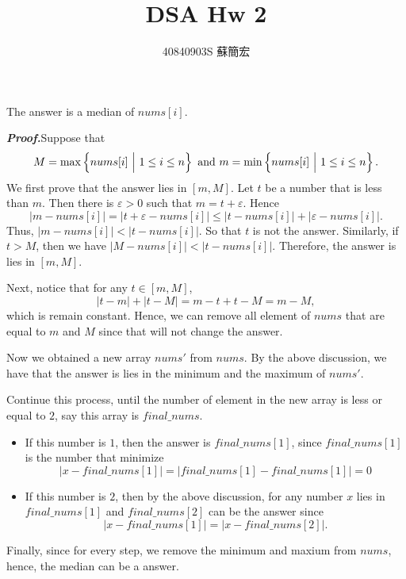 \documentclass[12pt,a4paper,titlepage,AutoFakeBold]{article}
\title{DSA Hw 2}
\author{40840903S 蘇簡宏}
\newcommand{\bfit}[1]{%
    \textbf{\textit{#1}}}
\begin{document}
\fontsize{12pt}{20pt}\selectfont
The answer is a median of $nums[i]$.

\bfit{Proof.}\quad Suppose that \[
    M = \max \left\{nums[i]\ \Big|\ 1\leq i\leq n\right\} \textup{ and } m = \min \left\{nums[i]\ \Big|\ 1\leq i\leq n\right\}.
\]
We first prove that the answer lies in $[m, M]$. Let $t$ be a number that is less than $m$. Then there is $\varepsilon > 0$ such that $m = t + \varepsilon$. Hence 
\[
    \left|m - nums[i]\right| = \left| t + \varepsilon - nums[i]\right|\leq \left|t - nums[i]\right| + \left|\varepsilon - nums[i]\right|.
\]
Thus, $\left|m - nums[i]\right| < \left|t - nums[i]\right|$. So that $t$ is not the answer. Similarly, if $t > M$, then we have $\left|M - nums[i]\right| < \left|t - nums[i]\right|$. Therefore, the answer is lies in $[m, M]$.

Next, notice that for any $t \in [m, M]$, 
\[
    \left|t - m\right| + \left|t - M\right| = m - t + t - M = m - M,
\]
which is remain constant. Hence, we can remove all element of $nums$ that are equal to $m$ and $M$ since that will not change the answer. 

Now we obtained a new array $nums'$ from $nums$. By the above discussion, we have that the answer is lies in the minimum and the maximum of $nums'$. 

Continue this process, until the number of element in the new array is less or equal to $2$, say this array is $final\_nums$.
\begin{itemize}[noitemsep,topsep=0pt]
    \item If this number is $1$, then the answer is $final\_nums[1]$, since $final\_nums[1]$ is the number that minimize \[
        \left|x - final\_nums[1]\right| = \left|final\_nums[1] - final\_nums[1]\right| = 0
    \]
    \item If this number is $2$, then by the above discussion, for any number $x$ lies in $final\_nums[1]$ and $final\_nums[2]$ can be the answer since 
    \[
        \left|x - final\_nums[1]\right| = \left|x - final\_nums[2]\right|.
    \]
\end{itemize}
Finally, since for every step, we remove the minimum and maxium from $nums$, hence, the median can be a answer.
\end{document}
